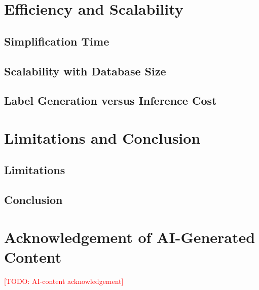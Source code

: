 \documentclass[conference]{IEEEtran}
\newcommand{\todo}[1]{\textcolor{red}{[TODO: #1]}}
\begin{document}
\section{Efficiency and Scalability}
\label{sec:efficiency}

\subsection{Simplification Time}
\label{sec:time}

\subsection{Scalability with Database Size}
\label{sec:scalability}

\subsection{Label Generation versus Inference Cost}
\label{sec:label-cost}

\section{Limitations and Conclusion}
\label{sec:conclusion}

\subsection{Limitations}
\label{sec:limitations}

\subsection{Conclusion}
\label{sec:conclusion-main}

\section*{Acknowledgement of AI-Generated Content}
\todo{AI-content acknowledgement}


% 
\end{document}

